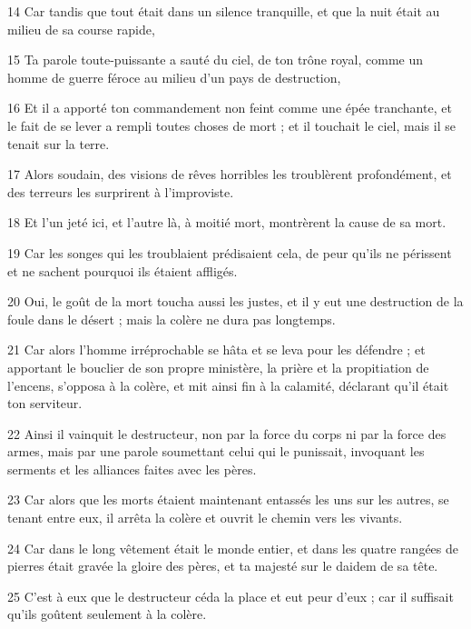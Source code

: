 \par 14 Car tandis que tout était dans un silence tranquille, et que la nuit était au milieu de sa course rapide,
\par 15 Ta parole toute-puissante a sauté du ciel, de ton trône royal, comme un homme de guerre féroce au milieu d'un pays de destruction,
\par 16 Et il a apporté ton commandement non feint comme une épée tranchante, et le fait de se lever a rempli toutes choses de mort ; et il touchait le ciel, mais il se tenait sur la terre.
\par 17 Alors soudain, des visions de rêves horribles les troublèrent profondément, et des terreurs les surprirent à l'improviste.
\par 18 Et l'un jeté ici, et l'autre là, à moitié mort, montrèrent la cause de sa mort.
\par 19 Car les songes qui les troublaient prédisaient cela, de peur qu'ils ne périssent et ne sachent pourquoi ils étaient affligés.
\par 20 Oui, le goût de la mort toucha aussi les justes, et il y eut une destruction de la foule dans le désert ; mais la colère ne dura pas longtemps.
\par 21 Car alors l'homme irréprochable se hâta et se leva pour les défendre ; et apportant le bouclier de son propre ministère, la prière et la propitiation de l'encens, s'opposa à la colère, et mit ainsi fin à la calamité, déclarant qu'il était ton serviteur.
\par 22 Ainsi il vainquit le destructeur, non par la force du corps ni par la force des armes, mais par une parole soumettant celui qui le punissait, invoquant les serments et les alliances faites avec les pères.
\par 23 Car alors que les morts étaient maintenant entassés les uns sur les autres, se tenant entre eux, il arrêta la colère et ouvrit le chemin vers les vivants.
\par 24 Car dans le long vêtement était le monde entier, et dans les quatre rangées de pierres était gravée la gloire des pères, et ta majesté sur le daidem de sa tête.
\par 25 C'est à eux que le destructeur céda la place et eut peur d'eux ; car il suffisait qu'ils goûtent seulement à la colère.


